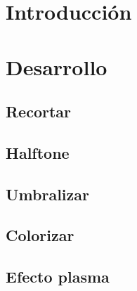 \documentclass[a4paper,10pt,twoside]{article}
\begin{document}
\newpage




\tableofcontents

\newpage




\section{Introducción}

\blindtext




\section{Desarrollo}

\subsection{Recortar}

\subsection{Halftone}

\subsection{Umbralizar}

\subsection{Colorizar}

\subsection{Efecto plasma}
\end{document}
